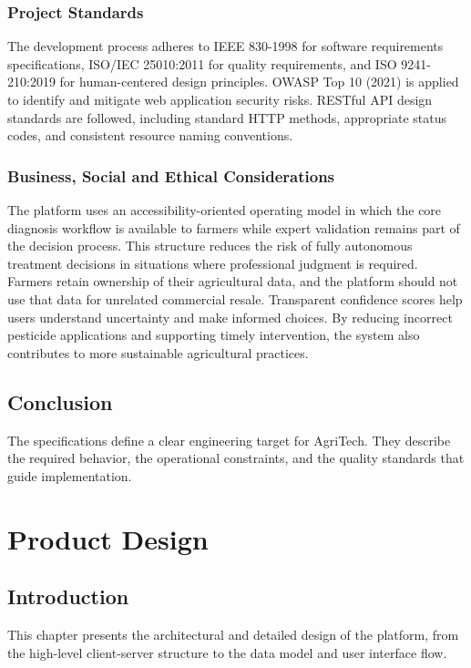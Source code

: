 \documentclass[12pt]{article}
\begin{document}
\subsubsection{Project Standards}
The development process adheres to IEEE 830-1998 for software requirements specifications, ISO/IEC 25010:2011 for quality requirements, and ISO 9241-210:2019 for human-centered design principles. OWASP Top 10 (2021) is applied to identify and mitigate web application security risks. RESTful API design standards are followed, including standard HTTP methods, appropriate status codes, and consistent resource naming conventions.

\subsubsection{Business, Social and Ethical Considerations}
The platform uses an accessibility-oriented operating model in which the core diagnosis workflow is available to farmers while expert validation remains part of the decision process. This structure reduces the risk of fully autonomous treatment decisions in situations where professional judgment is required. Farmers retain ownership of their agricultural data, and the platform should not use that data for unrelated commercial resale. Transparent confidence scores help users understand uncertainty and make informed choices. By reducing incorrect pesticide applications and supporting timely intervention, the system also contributes to more sustainable agricultural practices.

\subsection{Conclusion}
The specifications define a clear engineering target for AgriTech. They describe the required behavior, the operational constraints, and the quality standards that guide implementation.

\newpage
\section{Product Design}

\subsection{Introduction}
This chapter presents the architectural and detailed design of the platform, from the high-level client-server structure to the data model and user interface flow.
\end{document}
